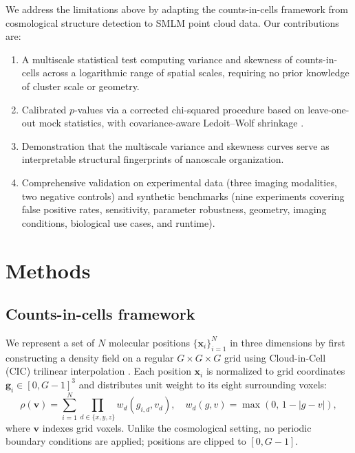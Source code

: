 \documentclass[11pt]{article}
\begin{document}
We address the limitations above by adapting the counts-in-cells
framework from cosmological structure detection
\citep{colombi1994,szapudi1996} to SMLM point cloud data. Our
contributions are:
\begin{enumerate}
  \item A multiscale statistical test computing variance and skewness of
        counts-in-cells across a logarithmic range of spatial scales,
        requiring no prior knowledge of cluster scale or geometry.
  \item Calibrated $p$-values via a corrected chi-squared procedure based
        on leave-one-out mock statistics, with covariance-aware
        Ledoit--Wolf shrinkage \citep{ledoit2004}.
  \item Demonstration that the multiscale variance and skewness curves
        serve as interpretable structural fingerprints of nanoscale
        organization.
  \item Comprehensive validation on experimental data (three imaging
        modalities, two negative controls) and synthetic benchmarks
        (nine experiments covering false positive rates, sensitivity,
        parameter robustness, geometry, imaging conditions, biological
        use cases, and runtime).
\end{enumerate}

\section{Methods}

\subsection{Counts-in-cells framework}

We represent a set of $N$ molecular positions
$\{\mathbf{x}_i\}_{i=1}^{N}$ in three dimensions by first constructing
a density field on a regular $G \times G \times G$ grid using Cloud-in-Cell
(CIC) trilinear interpolation \citep{hockney1981}. Each position
$\mathbf{x}_i$ is normalized to grid coordinates
$\mathbf{g}_i \in [0, G-1]^3$ and distributes unit weight to its eight
surrounding voxels:
\begin{equation}
  \rho(\mathbf{v}) = \sum_{i=1}^{N} \prod_{d \in \{x,y,z\}}
    w_d(g_{i,d}, v_d),
  \quad
  w_d(g, v) = \max(0,\, 1 - |g - v|),
  \label{eq:cic}
\end{equation}
where $\mathbf{v}$ indexes grid voxels. Unlike the cosmological setting,
no periodic boundary conditions are applied; positions are clipped to
$[0, G-1]$.
\end{document}
